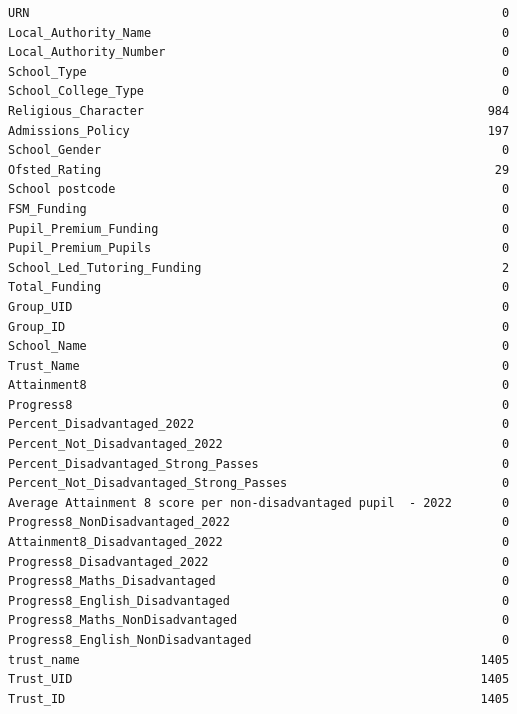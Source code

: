 \documentclass[
  letterpaper,
  DIV=11,
  numbers=noendperiod]{scrartcl}
\begin{document}
\begin{verbatim}
URN                                                                  0
Local_Authority_Name                                                 0
Local_Authority_Number                                               0
School_Type                                                          0
School_College_Type                                                  0
Religious_Character                                                984
Admissions_Policy                                                  197
School_Gender                                                        0
Ofsted_Rating                                                       29
School postcode                                                      0
FSM_Funding                                                          0
Pupil_Premium_Funding                                                0
Pupil_Premium_Pupils                                                 0
School_Led_Tutoring_Funding                                          2
Total_Funding                                                        0
Group_UID                                                            0
Group_ID                                                             0
School_Name                                                          0
Trust_Name                                                           0
Attainment8                                                          0
Progress8                                                            0
Percent_Disadvantaged_2022                                           0
Percent_Not_Disadvantaged_2022                                       0
Percent_Disadvantaged_Strong_Passes                                  0
Percent_Not_Disadvantaged_Strong_Passes                              0
Average Attainment 8 score per non-disadvantaged pupil  - 2022       0
Progress8_NonDisadvantaged_2022                                      0
Attainment8_Disadvantaged_2022                                       0
Progress8_Disadvantaged_2022                                         0
Progress8_Maths_Disadvantaged                                        0
Progress8_English_Disadvantaged                                      0
Progress8_Maths_NonDisadvantaged                                     0
Progress8_English_NonDisadvantaged                                   0
trust_name                                                        1405
Trust_UID                                                         1405
Trust_ID                                                          1405

\end{verbatim}
\end{document}
